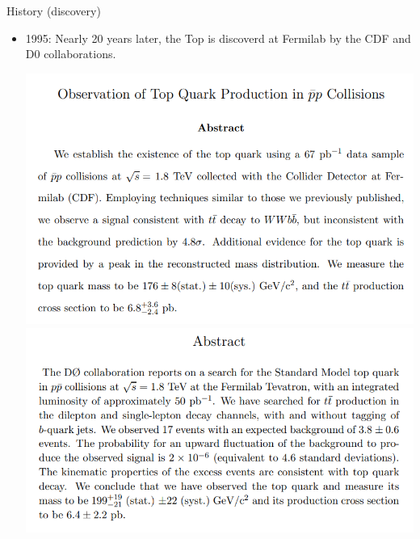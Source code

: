 \documentclass{beamer}
\begin{document}
\begin{frame}{History (discovery)}
    \begin{itemize}
        \item<1-> 1995: Nearly 20 years later, the Top is discoverd at Fermilab by the CDF and D0 collaborations.
        \begin{center}
            \includegraphics[scale=0.35]{images/cdf.PNG}
            \includegraphics[scale=0.35]{images/D0.PNG}
        \end{center}
    \end{itemize}
\end{frame}
\end{document}

